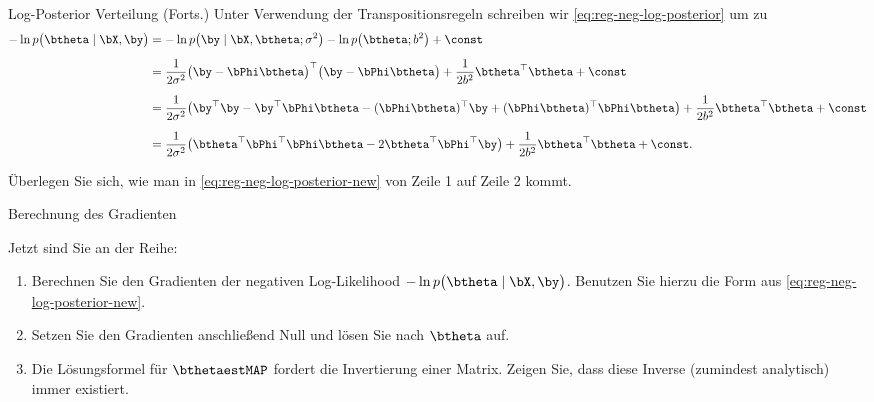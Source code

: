 \begin{frame}{Log-Posterior Verteilung (Forts.)}{}
	Unter Verwendung der Transpositionsregeln schreiben wir \eqref{eq:reg-neg-log-posterior} um zu
	\begin{equation} \label{eq:reg-neg-log-posterior-new}
		\begin{aligned}
			-\ln p\bigl( \btheta \mid \bX, \by \bigr)
				&= -\ln p\bigl( \by \mid \bX, \btheta; \sigma^2 \bigr) - \ln p\bigl( \btheta; b^2 \bigr) + \const
		\\[2mm]
				&= \frac{1}{2 \sigma^2} \bigl( \by - \bPhi \btheta \bigr)^\top \bigl( \by - \bPhi \btheta \bigr)
					+ \frac{1}{2 b^2} \btheta^\top \btheta + \const
		\\[2mm]
				&= \frac{1}{2 \sigma^2} \bigl( \by^\top \by - \by^\top \bPhi \btheta - (\bPhi \btheta)^\top \by
					+ (\bPhi \btheta)^\top \bPhi \btheta \bigr) + \frac{1}{2 b^2} \btheta^\top \btheta + \const
		\\[2mm]
				&= \frac{1}{2 \sigma^2} \bigl( \btheta^\top \bPhi^\top \bPhi \btheta - 2 \btheta^\top \bPhi^\top \by \bigr)
					+ \frac{1}{2 b^2} \btheta^\top \btheta + \const.
		\end{aligned}
	\end{equation}
	
	\begin{mytask}
		Überlegen Sie sich, wie man in \eqref{eq:reg-neg-log-posterior-new} von Zeile 1 auf Zeile 2 kommt.
	\end{mytask}
\end{frame}


\begin{frame}{Berechnung des Gradienten}{}
	\begin{mytask}
		Jetzt sind Sie an der Reihe:
		\begin{enumerate}
			\item Berechnen Sie den Gradienten der negativen Log-Likelihood $-\ln p\bigl( \btheta \mid \bX, \by \bigr)$.
				Benutzen Sie hierzu die Form aus \eqref{eq:reg-neg-log-posterior-new}.
			\item Setzen Sie den Gradienten anschließend Null und lösen Sie nach $\btheta$ auf.
			\item Die Lösungsformel für $\bthetaestMAP$ fordert die Invertierung einer Matrix. Zeigen Sie,
				dass diese Inverse (zumindest analytisch) immer existiert.
		\end{enumerate}
	\end{mytask}
\end{frame}



